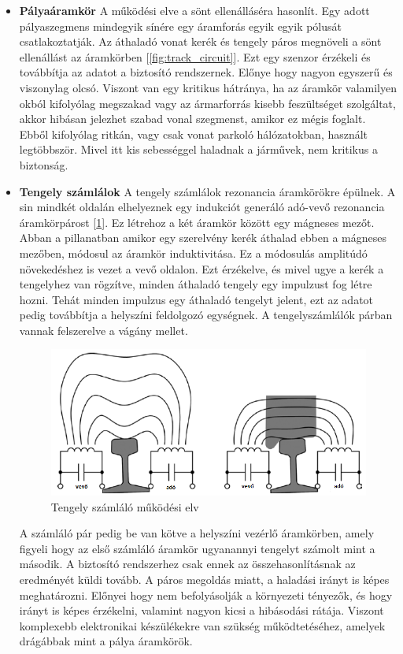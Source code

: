 \documentclass[a4paper,12pt]{article}
\begin{document}
\begin{itemize}
	\item \textbf{Pályaáramkör} A működési elve a sönt ellenálláséra hasonlít.
	Egy adott pályaszegmens mindegyik sínére egy áramforás egyik egyik pólusát csatlakoztatják. Az áthaladó vonat kerék és tengely páros megnöveli a sönt ellenállást az áramkörben [\ref{fig:track_circuit}].
	Ezt egy szenzor érzékeli és továbbítja az adatot a biztosító rendszernek. Előnye hogy nagyon egyszerű és viszonylag olcsó.
	Viszont van egy kritikus hátránya, ha az áramkör valamilyen okból kifolyólag megszakad vagy az ármarforrás kisebb feszültséget szolgáltat, akkor hibásan jelezhet szabad vonal szegmenst, amikor ez mégis foglalt.
	Ebből kifolyólag ritkán, vagy csak vonat parkoló hálózatokban, használt legtöbbször. Mivel itt kis sebességgel haladnak a járművek, nem kritikus a biztonság.
	
	\item \textbf{Tengely számlálok} A tengely számlálok rezonancia áramkörökre épülnek. A sin mindkét oldalán elhelyeznek egy indukciót generáló adó-vevő rezonancia áramkörpárost [\ref{fig:axle_counter}].
	Ez létrehoz a két áramkör között egy mágneses mezőt. Abban a pillanatban amikor egy szerelvény kerék áthalad ebben a mágneses mezőben, módosul az áramkör induktivitása. 
	Ez a módosulás amplitúdó növekedéshez is vezet a vevő oldalon. Ezt érzékelve, és mivel ugye a kerék a tengelyhez van rögzítve, minden áthaladó tengely egy impulzust fog létre hozni.
	Tehát minden impulzus egy áthaladó tengelyt jelent, ezt az adatot pedig továbbítja a helyszíni feldolgozó egységnek.
	A tengelyszámlálók párban vannak felszerelve a vágány mellet. 
	\begin{figure}[htp]
		\centering
		\includegraphics[width=\linewidth]{images/axle_counter.png}
		\caption[Tengely számláló működési elv]{Tengely számláló  működési elv}
		\label{fig:axle_counter}
	\end{figure}
	A számláló pár pedig be van kötve a helyszíni vezérlő áramkörben, amely figyeli hogy az első számláló áramkör ugyanannyi tengelyt számolt mint a második.
	A biztosító rendszerhez csak ennek az összehasonlításnak az eredményét küldi tovább.
	A páros megoldás miatt, a haladási irányt is képes meghatározni.
	Előnyei hogy nem befolyásolják a környezeti tényezők, és hogy irányt is képes érzékelni, valamint nagyon kicsi a hibásodási rátája.
	Viszont komplexebb elektronikai készülékekre van szükség működtetéséhez, amelyek drágábbak mint a pálya áramkörök.
\end{itemize}
\end{document}
